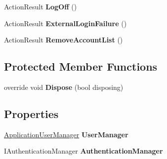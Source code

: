 \begin{DoxyCompactItemize}
\item 
Action\+Result {\bfseries Log\+Off} ()\hypertarget{class_p_c_builder_m_v_c_1_1_controllers_1_1_account_controller_a1e8962ce6f6e6b413c0e4aa54ee8ff4e}{}\label{class_p_c_builder_m_v_c_1_1_controllers_1_1_account_controller_a1e8962ce6f6e6b413c0e4aa54ee8ff4e}

\item 
Action\+Result {\bfseries External\+Login\+Failure} ()\hypertarget{class_p_c_builder_m_v_c_1_1_controllers_1_1_account_controller_a98f2769b65d47f2eecf8de39e891a477}{}\label{class_p_c_builder_m_v_c_1_1_controllers_1_1_account_controller_a98f2769b65d47f2eecf8de39e891a477}

\item 
Action\+Result {\bfseries Remove\+Account\+List} ()\hypertarget{class_p_c_builder_m_v_c_1_1_controllers_1_1_account_controller_aacd25e3088db5d4fa258f686eb71c299}{}\label{class_p_c_builder_m_v_c_1_1_controllers_1_1_account_controller_aacd25e3088db5d4fa258f686eb71c299}

\end{DoxyCompactItemize}
\subsection*{Protected Member Functions}
\begin{DoxyCompactItemize}
\item 
override void {\bfseries Dispose} (bool disposing)\hypertarget{class_p_c_builder_m_v_c_1_1_controllers_1_1_account_controller_a61fac6a43b44896e9ed7879a51a1c487}{}\label{class_p_c_builder_m_v_c_1_1_controllers_1_1_account_controller_a61fac6a43b44896e9ed7879a51a1c487}

\end{DoxyCompactItemize}
\subsection*{Properties}
\begin{DoxyCompactItemize}
\item 
\hyperlink{class_p_c_builder_m_v_c_1_1_application_user_manager}{Application\+User\+Manager} {\bfseries User\+Manager}\hypertarget{class_p_c_builder_m_v_c_1_1_controllers_1_1_account_controller_a7bfd8964878a6c640b079f81641ebed6}{}\label{class_p_c_builder_m_v_c_1_1_controllers_1_1_account_controller_a7bfd8964878a6c640b079f81641ebed6}

\item 
I\+Authentication\+Manager {\bfseries Authentication\+Manager}\hypertarget{class_p_c_builder_m_v_c_1_1_controllers_1_1_account_controller_a4fe85c110c5c3dede8d55b27fcadaa3f}{}\label{class_p_c_builder_m_v_c_1_1_controllers_1_1_account_controller_a4fe85c110c5c3dede8d55b27fcadaa3f}

\end{DoxyCompactItemize}
